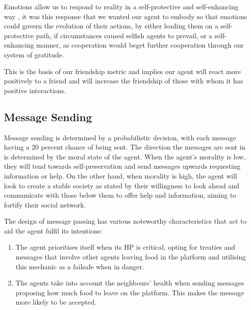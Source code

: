 Emotions allow us to respond to reality in a self-protective and self-enhancing way \cite{ekman_1992}, it was this response that we wanted our agent to embody so that emotions could govern the evolution of their actions, by either leading them on a self-protective path, if circumstances caused selfish agents to prevail, or a self-enhancing manner, as cooperation would beget further cooperation through our system of gratitude.\par
This is the basis of our friendship metric and implies our agent will react more positively to a friend and will increase the friendship of those with whom it has positive interactions.

\subsection{Message Sending}
Message sending is determined by a probabilistic decision, with each message having a 20 percent chance of being sent. The direction the messages are sent in is determined by the moral state of the agent. When the agent's morality is low, they will tend towards self-preservation and send messages upwards requesting information or help. On the other hand, when morality is high, the agent will look to create a stable society as stated by their willingness to look ahead and communicate with those below them to offer help and information, aiming to fortify their social network.\par 
The design of message passing has various noteworthy characteristics that act to aid the agent fulfil its intentions:
\begin{enumerate}
    \item The agent prioritises itself when its HP is critical, opting for treaties and messages that involve other agents leaving food in the platform and utilising this mechanic as a failsafe when in danger.
    \item The agents take into account the neighbours' health when sending messages proposing how much food to leave on the platform. This makes the message more likely to be accepted. 
\end{enumerate}

